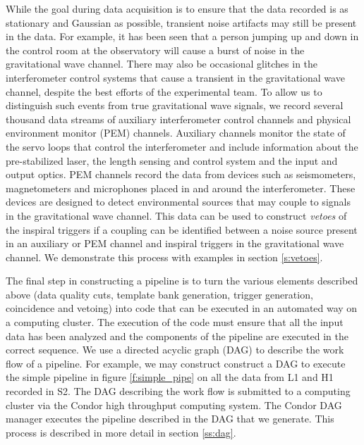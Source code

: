While the goal during data acquisition is to ensure that the data recorded is
as stationary and Gaussian as possible, transient noise artifacts may still be
present in the data. For example, it has been seen that a person jumping up
and down in the control room at the observatory will cause a burst of noise in
the gravitational wave channel. There may also be occasional glitches in the
interferometer control systems that cause a transient in the gravitational
wave channel, despite the best efforts of the experimental team. To allow us
to distinguish such events from true gravitational wave signals, we record
several thousand data streams of auxiliary interferometer control channels and
physical environment monitor (PEM) channels. Auxiliary channels monitor the
state of the servo loops that control the interferometer and include
information about the pre-stabilized laser, the length sensing and control
system and the input and output optics.  PEM channels record the data from
devices such as seismometers, magnetometers and microphones placed in and
around the interferometer. These devices are designed to detect environmental
sources that may couple to signals in the gravitational wave channel. This
data can be used to construct \emph{vetoes} of the inspiral triggers if a
coupling can be identified between a noise source present in an auxiliary or
PEM channel and inspiral triggers in the gravitational wave channel.  We
demonstrate this process with examples in section \ref{s:vetoes}. 

The final step in constructing a pipeline is to turn the various elements
described above (data quality cuts, template bank generation, trigger
generation, coincidence and vetoing) into code that can be executed in an
automated way on a computing cluster. The execution of the code must ensure
that all the input data has been analyzed and the components of the pipeline
are executed in the correct sequence. We use a directed acyclic graph
(DAG) to describe the work flow of a pipeline.  For example, we may
construct construct a DAG to execute the simple pipeline in figure
\ref{f:simple_pipe} on all the data from L1 and H1 recorded in S2. The DAG
describing the work flow is submitted to a computing cluster via the Condor
high throughput computing system\cite{beowulfbook-condor}. The Condor DAG
manager executes the pipeline described in the DAG that we generate. This
process is described in more detail in section \ref{ss:dag}.

